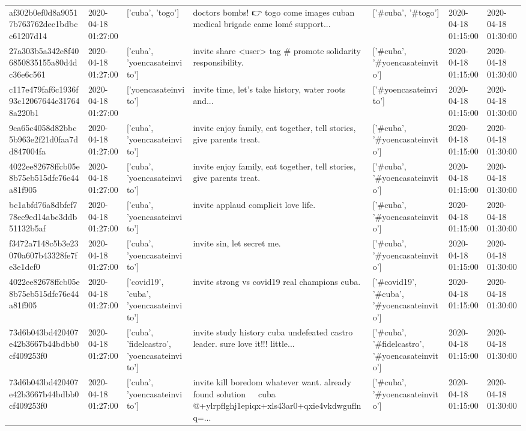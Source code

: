 \begin{tabular}{lllllll}
af302b0ef0d8a90517b763762dec1bdbcc61207d14 & 2020-04-18 01:27:00 & ['cuba', 'togo'] & doctors bombs! 👉 togo come images cuban medical brigade came lomé support... & ['#cuba', '#togo'] & 2020-04-18 01:15:00 & 2020-04-18 01:30:00 \\
27a303b5a342e8f406850835155a80d4dc36e6c561 & 2020-04-18 01:27:00 & ['cuba', 'yoencasateinvito'] & invite share <user> tag \# promote solidarity responsibility. & ['#cuba', '#yoencasateinvito'] & 2020-04-18 01:15:00 & 2020-04-18 01:30:00 \\
c117e479faf6c1936f93c12067644e317648a220b1 & 2020-04-18 01:27:00 & ['yoencasateinvito'] & invite time, let's take history, water roots and... & ['#yoencasateinvito'] & 2020-04-18 01:15:00 & 2020-04-18 01:30:00 \\
9ca65c4058d82bbc5b963e2f21d0faa7dd847004fa & 2020-04-18 01:27:00 & ['cuba', 'yoencasateinvito'] & invite enjoy family, eat together, tell stories, give parents treat. & ['#cuba', '#yoencasateinvito'] & 2020-04-18 01:15:00 & 2020-04-18 01:30:00 \\
4022ee82678ffcb05e8b75eb515dfc76e44a81f905 & 2020-04-18 01:27:00 & ['cuba', 'yoencasateinvito'] & invite enjoy family, eat together, tell stories, give parents treat. & ['#cuba', '#yoencasateinvito'] & 2020-04-18 01:15:00 & 2020-04-18 01:30:00 \\
bc1abfd76a8dbfef778ee9ed14abc3ddb51132b5af & 2020-04-18 01:27:00 & ['cuba', 'yoencasateinvito'] & invite applaud complicit love life. & ['#cuba', '#yoencasateinvito'] & 2020-04-18 01:15:00 & 2020-04-18 01:30:00 \\
f3472a7148c5b3e23070a607b43328fe7fe3e1dcf0 & 2020-04-18 01:27:00 & ['cuba', 'yoencasateinvito'] & invite sin, let secret me. & ['#cuba', '#yoencasateinvito'] & 2020-04-18 01:15:00 & 2020-04-18 01:30:00 \\
4022ee82678ffcb05e8b75eb515dfc76e44a81f905 & 2020-04-18 01:27:00 & ['covid19', 'cuba', 'yoencasateinvito'] & invite strong vs covid19 real champions cuba. & ['#covid19', '#cuba', '#yoencasateinvito'] & 2020-04-18 01:15:00 & 2020-04-18 01:30:00 \\
73d6b043bd420407e42b3667b44bdbb0cf409253f0 & 2020-04-18 01:27:00 & ['cuba', 'fidelcastro', 'yoencasateinvito'] & invite study history cuba undefeated castro leader. sure love it!!! little... & ['#cuba', '#fidelcastro', '#yoencasateinvito'] & 2020-04-18 01:15:00 & 2020-04-18 01:30:00 \\
73d6b043bd420407e42b3667b44bdbb0cf409253f0 & 2020-04-18 01:27:00 & ['cuba', 'yoencasateinvito'] & invite kill boredom whatever want. already found solution 🤣🤣🤣 cuba @+ylrpflghj1epiqx+xls43ar0+qxie4vkdwguflnq=... & ['#cuba', '#yoencasateinvito'] & 2020-04-18 01:15:00 & 2020-04-18 01:30:00 \\

\end{tabular}
